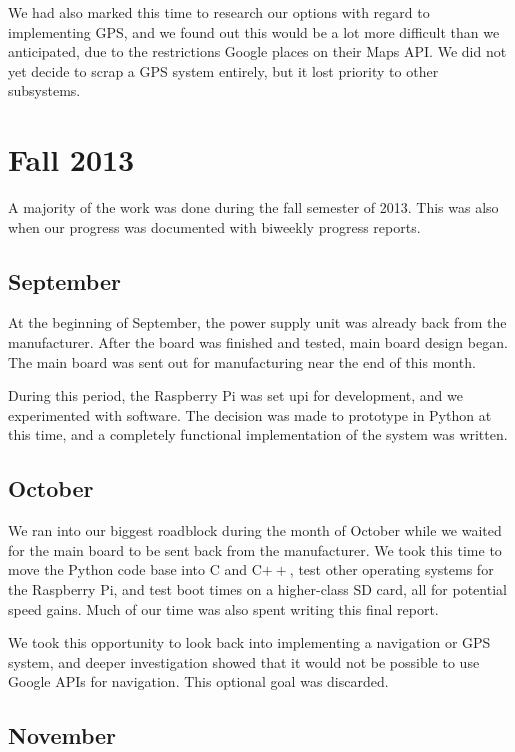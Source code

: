 We had also marked this time to research our options with regard to
implementing GPS, and we found out this would be a lot more difficult than
we anticipated, due to the restrictions Google places on their Maps API.
We did not yet decide to scrap a GPS system entirely, but it lost priority to
other subsystems.

\section{Fall 2013}

A majority of the work was done during the fall semester of 2013. This was also
when our progress was documented with biweekly progress reports.

\subsection{September}

At the beginning of September, the power supply unit was already back from the
manufacturer. After the board was finished and tested, main board design began.
The main board was sent out for manufacturing near the end of this month.

During this period, the Raspberry Pi was set upi for development, and we
experimented with software. The decision was made to prototype in Python
at this time, and a completely functional implementation of the system was written.

\subsection{October}

We ran into our biggest roadblock during the month of October while we waited
for the main board to be sent back from the manufacturer. We took this time to
move the Python code base into C and C$++$, test other
operating systems for the Raspberry Pi, and test boot times on a higher-class
SD card, all for potential speed gains. Much of our time was also spent writing
this final report.

We took this opportunity to look back into implementing a navigation or GPS
system, and deeper investigation showed that it would not be possible to use
Google APIs for navigation. This optional goal was discarded.

\subsection{November}

